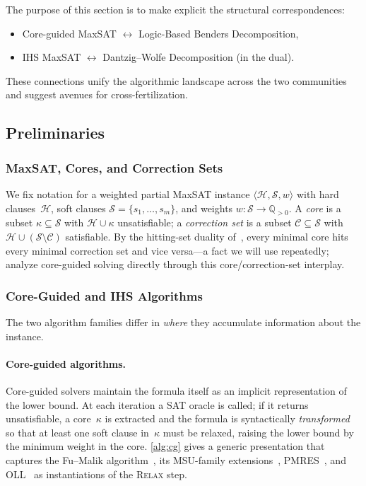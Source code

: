 The purpose of this section is to make explicit the structural correspondences:
\begin{itemize}
\item Core-guided MaxSAT $\longleftrightarrow$ Logic-Based Benders Decomposition,
\item IHS MaxSAT $\longleftrightarrow$ Dantzig--Wolfe Decomposition (in the dual).
\end{itemize}
These connections unify the algorithmic landscape across the two communities
and suggest avenues for cross-fertilization.

\subsection{Preliminaries}
\label{sec:prelim}

\subsubsection{MaxSAT, Cores, and Correction Sets}

We fix notation for a weighted partial MaxSAT instance
$\langle \mathcal{H}, \mathcal{S}, w \rangle$ with hard clauses~$\mathcal{H}$,
soft clauses $\mathcal{S} = \{s_1,\ldots,s_m\}$, and weights
$w : \mathcal{S} \to \mathbb{Q}_{>0}$. A \emph{core} is a subset
$\kappa \subseteq \mathcal{S}$ with $\mathcal{H} \cup \kappa$ unsatisfiable; a
\emph{correction set} is a subset $\mathcal{C} \subseteq \mathcal{S}$ with
$\mathcal{H} \cup (\mathcal{S} \setminus \mathcal{C})$ satisfiable. By the
hitting-set duality of~\citet{liffiton2008algorithms}, every minimal core hits
every minimal correction set and vice versa---a fact we will use
repeatedly; \citet{narodytska2022cores} analyze core-guided solving directly
through this core/correction-set interplay.

\subsubsection{Core-Guided and IHS Algorithms}

The two algorithm families differ in \emph{where} they accumulate information about the instance.

\paragraph{Core-guided algorithms.}
Core-guided solvers maintain the formula itself as an implicit representation of the lower bound. At each iteration a SAT oracle is called; if it returns unsatisfiable, a core~$\kappa$ is extracted and the formula is syntactically \emph{transformed} so that at least one soft clause in~$\kappa$ must be relaxed, raising the lower bound by the minimum weight in the core. \cref{alg:cg} gives a generic presentation that captures the Fu--Malik algorithm~\citep{fu2006solving}, its MSU-family extensions~\citep{marquessilva2008algorithms}, PMRES~\citep{narodytska2014maximum}, and OLL~\citep{morgado2014core} as instantiations of the \textsc{Relax} step.

